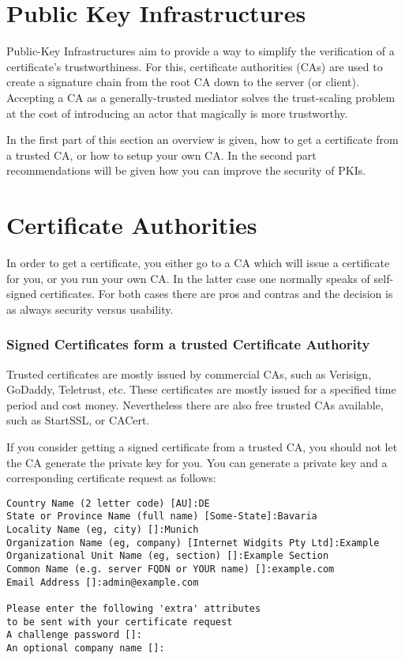 \section{Public Key Infrastructures}
\label{section:PKIs}

Public-Key Infrastructures aim to provide a way to simplify the verification of
a certificate's trustworthiness.  For this, certificate authorities (CAs) are
used to create a signature chain from the root CA down to the server (or client).
Accepting a CA as a generally-trusted mediator solves the trust-scaling problem
at the cost of introducing an actor that magically is more trustworthy.

In the first part of this section an overview is given, how to get a certificate from
a trusted CA, or how to setup your own CA. In the second part recommendations will be 
given how you can improve the security of PKIs.

\section{Certificate Authorities}
\label{sec:cas}
In order to get a certificate, you either go to a CA which will issue a certificate for you,
or you run your own CA. In the latter case one normally speaks of self-signed 
certificates. For both cases there are pros and contras and the decision is
as always security versus usability.

\subsubsection{Signed Certificates form a trusted Certificate Authority}
\label{sec:signcertfromca}
Trusted certificates are mostly issued by commercial CAs, such as Verisign, GoDaddy, Teletrust, etc.
These certificates are mostly issued for a specified time period and cost money. Nevertheless
there are also free trusted CAs available, such as StartSSL, or CACert.

If you consider getting a signed certificate from a trusted CA, you should not let the CA generate the 
private key for you. You can generate a private key and a corresponding certificate request as follows:

\begin{lstlisting}[breaklines]
% openssl req -new -nodes -keyout <servername>.key -out <servername>.csr -newkey rsa:<keysize>
Country Name (2 letter code) [AU]:DE
State or Province Name (full name) [Some-State]:Bavaria
Locality Name (eg, city) []:Munich
Organization Name (eg, company) [Internet Widgits Pty Ltd]:Example
Organizational Unit Name (eg, section) []:Example Section
Common Name (e.g. server FQDN or YOUR name) []:example.com
Email Address []:admin@example.com

Please enter the following 'extra' attributes
to be sent with your certificate request
A challenge password []:
An optional company name []:
\end{lstlisting}

